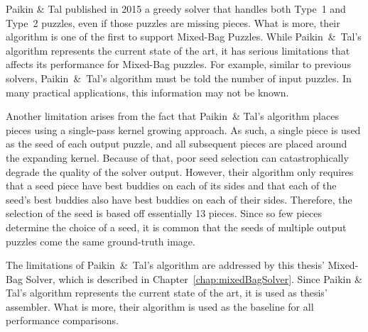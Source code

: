 Paikin \& Tal \cite{paikin2015} published in 2015 a greedy solver that handles both Type~1 and Type~2 puzzles, even if those puzzles are missing pieces.  What is more, their algorithm is one of the first to support Mixed-Bag Puzzles.  While Paikin~\&~Tal's algorithm represents the current state of the art, it has serious limitations that affects its performance for Mixed-Bag puzzles.  For example, similar to previous solvers, Paikin~\&~Tal's algorithm must be told the number of input puzzles.  In many practical applications, this information may not be known.

Another limitation arises from the fact that Paikin~\& Tal's algorithm places pieces using a single-pass kernel growing approach.  As such, a single piece is used as the seed of each output puzzle, and all subsequent pieces are placed around the expanding kernel.  Because of that, poor seed selection can catastrophically degrade the quality of the solver output.  However, their algorithm only requires that a seed piece have best buddies on each of its sides and that each of the seed's best buddies also have best buddies on each of their sides.  Therefore, the selection of the seed is based off essentially 13 pieces.  Since so few pieces determine the choice of a seed, it is common that the seeds of multiple output puzzles come the same ground-truth image.

The limitations of Paikin~\&~Tal's algorithm are addressed by this thesis' Mixed-Bag Solver, which is described in Chapter~\ref{chap:mixedBagSolver}.  Since Paikin \&  Tal's algorithm represents the current state of the art, it is used as thesis' assembler.  What is more, their algorithm is used as the baseline for all performance comparisons. 